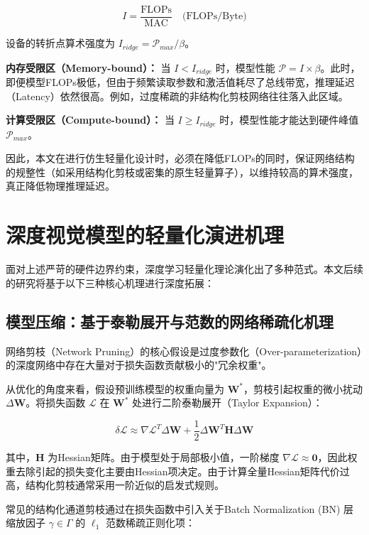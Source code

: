 \begin{equation}
I = \frac{\text{FLOPs}}{\text{MAC}} \quad \text{(FLOPs/Byte)}
\end{equation}

设备的转折点算术强度为 $I_{ridge} = \mathcal{P}_{max} / \beta$。

\textbf{内存受限区（Memory-bound）：} 当 $I < I_{ridge}$ 时，模型性能 $\mathcal{P} = I \times \beta$。此时，即便模型FLOPs极低，但由于频繁读取参数和激活值耗尽了总线带宽，推理延迟（Latency）依然很高。例如，过度稀疏的非结构化剪枝网络往往落入此区域。

\textbf{计算受限区（Compute-bound）：} 当 $I \ge I_{ridge}$ 时，模型性能才能达到硬件峰值 $\mathcal{P}_{max}$。

因此，本文在进行仿生轻量化设计时，必须在降低FLOPs的同时，保证网络结构的规整性（如采用结构化剪枝或密集的原生轻量算子），以维持较高的算术强度，真正降低物理推理延迟。

\section{深度视觉模型的轻量化演进机理}

面对上述严苛的硬件边界约束，深度学习轻量化理论演化出了多种范式。本文后续的研究将基于以下三种核心机理进行深度拓展：

\subsection{模型压缩：基于泰勒展开与范数的网络稀疏化机理}

网络剪枝（Network Pruning）的核心假设是过度参数化（Over-parameterization）的深度网络中存在大量对于损失函数贡献极小的"冗余权重"。

从优化的角度来看，假设预训练模型的权重向量为 $\mathbf{W}^*$，剪枝引起权重的微小扰动 $\Delta \mathbf{W}$。将损失函数 $\mathcal{L}$ 在 $\mathbf{W}^*$ 处进行二阶泰勒展开（Taylor Expansion）：

\begin{equation}
\delta \mathcal{L} \approx \nabla \mathcal{L}^T \Delta \mathbf{W} + \frac{1}{2} \Delta \mathbf{W}^T \mathbf{H} \Delta \mathbf{W}
\end{equation}

其中，$\mathbf{H}$ 为Hessian矩阵。由于模型处于局部极小值，一阶梯度 $\nabla \mathcal{L} \approx \mathbf{0}$，因此权重去除引起的损失变化主要由Hessian项决定。由于计算全量Hessian矩阵代价过高，结构化剪枝通常采用一阶近似的启发式规则。

常见的结构化通道剪枝通过在损失函数中引入关于Batch Normalization (BN) 层缩放因子 $\gamma \in \Gamma$ 的 $\ell_1$ 范数稀疏正则化项：

